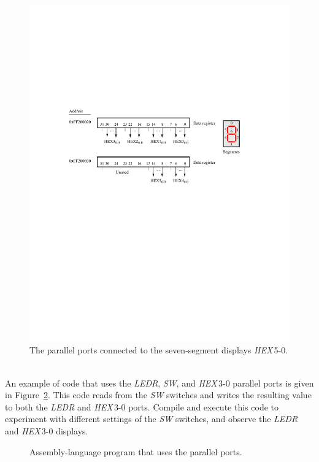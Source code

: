 \documentclass[epsfig,10pt,fullpage]{article}
\begin{document}
\begin{figure}[htb]
	\begin{center}
	\includegraphics[scale=1]{figures/figureHEX.pdf}
	\end{center}
	\caption{The parallel ports connected to the seven-segment displays {\it HEX}$\,$5-0.}
\label{fig:HEX}
\end{figure}

~\\
\noindent
An example of code that uses the {\it LEDR}, {\it SW}, and {\it HEX}$\,$3-0 parallel ports is 
given in Figure~\ref{fig:SWHEX}. This code reads from the {\it SW} switches and writes the
resulting value to both the {\it LEDR} and {\it HEX}$\,$3-0 ports. Compile and execute
this code to experiment with different settings of the {\it SW} switches, and observe the
{\it LEDR} and {\it HEX}$\,$3-0 displays.

\begin{figure}[H]
\begin{center}

\end{center}
\caption{Assembly-language program that uses the parallel ports.}
\label{fig:SWHEX}
\end{figure}
\end{document}

